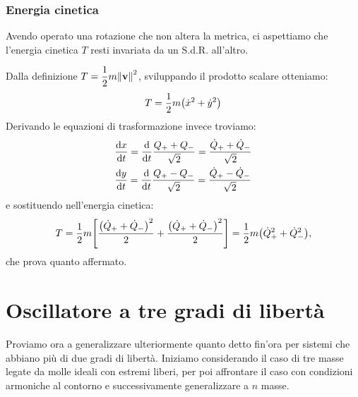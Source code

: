         \subsubsection{Energia cinetica}
            Avendo operato una rotazione che non altera la metrica, ci aspettiamo che l'energia cinetica $T$ resti invariata da un S.d.R. all'altro.
            \par Dalla definizione $\displaystyle T=\frac{1}{2}m\norm{\vb{v}}^2$, sviluppando il prodotto scalare otteniamo: $$T=\frac{1}{2}m\qty(\dot{x}^2+\dot{y}^2)$$ Derivando le equazioni di trasformazione invece troviamo:
            \begin{align*}
                &\dv{x}{t}=\dv{t}\frac{Q_++Q_-}{\sqrt{2}}=\frac{\dot{Q}_++\dot{Q}_-}{\sqrt{2}}\\
                &\dv{y}{t}=\dv{t}\frac{Q_+-Q_-}{\sqrt{2}}=\frac{\dot{Q}_+-\dot{Q}_-}{\sqrt{2}}
            \end{align*}
            e sostituendo nell'energia cinetica:
                $$T=\frac{1}{2}m\qty[\frac{\qty(\dot{Q}_++\dot{Q}_-)^2}{2}+\frac{\qty(\dot{Q}_++\dot{Q}_-)^2}{2}]=\frac{1}{2}m\qty(\dot{Q}_+^2+\dot{Q}_-^2),$$
            che prova quanto affermato.
\section{Oscillatore a tre gradi di libert\`a}
    Proviamo ora a generalizzare ulteriormente quanto detto fin'ora per sistemi che abbiano pi\`u di due gradi di libert\`a. Iniziamo considerando il caso di tre masse legate da molle ideali con estremi liberi, per poi affrontare il caso con condizioni armoniche al contorno e successivamente generalizzare a $n$ masse.
